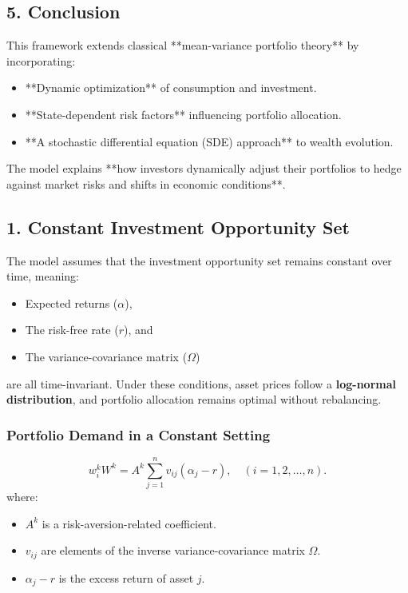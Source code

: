 \documentclass{article}
\begin{document}
\subsection*{5. Conclusion}
This framework extends classical **mean-variance portfolio theory** by incorporating:
\begin{itemize}
    \item **Dynamic optimization** of consumption and investment.
    \item **State-dependent risk factors** influencing portfolio allocation.
    \item **A stochastic differential equation (SDE) approach** to wealth evolution.
\end{itemize}
The model explains **how investors dynamically adjust their portfolios to hedge against market risks and shifts in economic conditions**.

\subsection*{1. Constant Investment Opportunity Set}
The model assumes that the investment opportunity set remains constant over time, meaning:
\begin{itemize}
    \item Expected returns (\(\alpha\)), 
    \item The risk-free rate (\(r\)), and
    \item The variance-covariance matrix (\(\Omega\))  
\end{itemize}
are all time-invariant. Under these conditions, asset prices follow a \textbf{log-normal distribution}, and portfolio allocation remains optimal without rebalancing.

\subsubsection*{Portfolio Demand in a Constant Setting}
\begin{equation}
w_i^k W^k = A^k \sum_{j=1}^{n} v_{ij} (\alpha_j - r), \quad (i = 1, 2, \dots, n).
\end{equation}
where:
\begin{itemize}
    \item \( A^k \) is a risk-aversion-related coefficient.
    \item \( v_{ij} \) are elements of the inverse variance-covariance matrix \( \Omega \).
    \item \( \alpha_j - r \) is the excess return of asset \( j \).
\end{itemize}
\end{document}
